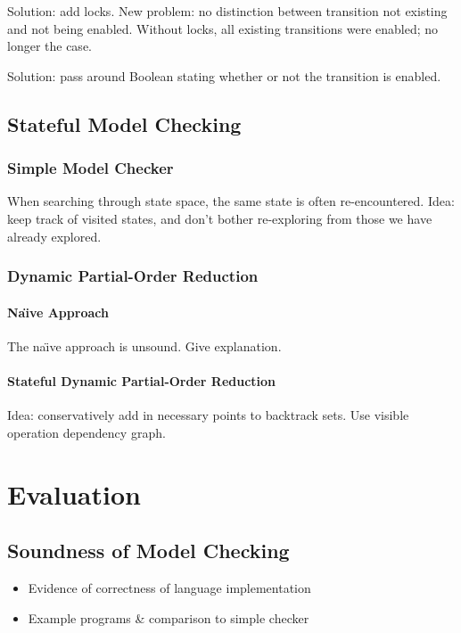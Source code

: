 \documentclass[12pt,a4paper,twoside,openright]{report}
\begin{document}
Solution: add locks. New problem: no distinction between
transition not existing and not being enabled. Without
locks, all existing transitions were enabled; no longer
the case.

Solution: pass around Boolean stating whether or not the transition
is enabled.

\section{Stateful Model Checking}

\subsection{Simple Model Checker}
When searching through state space, the same state is often
re-encountered. Idea: keep track of visited states, and don't bother
re-exploring from those we have already explored.

\subsection{Dynamic Partial-Order Reduction}

\subsubsection{Na\"{\i}ve Approach}
The na\"{\i}ve approach is unsound.
Give explanation.

\subsubsection{Stateful Dynamic Partial-Order Reduction}
Idea: conservatively add in necessary points to backtrack sets.
Use visible operation dependency graph.

\chapter{Evaluation}

\section{Soundness of Model Checking}

\begin{itemize}
	\item Evidence of correctness of language implementation
	\item Example programs \& comparison to simple checker
\end{itemize}
\end{document}

